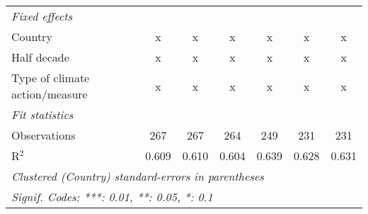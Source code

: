 \begin{tabular}{lcccccc}
   \emph{Fixed effects}\\
   Country                                           & x       & x       & x       & x             & x            & x\\  
   Half decade                                       & x       & x       & x       & x             & x            & x\\  
   Type of climate action/measure                    & x       & x       & x       & x             & x            & x\\  
   \midrule \emph{Fit statistics}\\
   Observations                                      & 267     & 267     & 264     & 249           & 231          & 231\\  
   R$^2$                                             & 0.609   & 0.610   & 0.604   & 0.639         & 0.628        & 0.631\\  
   \midrule
   \multicolumn{7}{l}{\emph{Clustered (Country) standard-errors in parentheses}}\\
   \multicolumn{7}{l}{\emph{Signif. Codes: ***: 0.01, **: 0.05, *: 0.1}}\\
\end{tabular}
\par\endgroup


